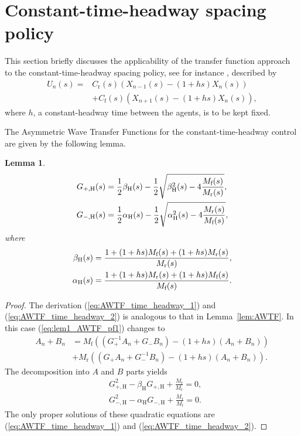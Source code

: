 \documentclass[10pt,twocolumn,twoside]{IEEEtran}
\newtheorem{lemma}{Lemma}
\theoremstyle{definition}
\newcommand{\revB}{Black}
\begin{document}
{\color{\revB}
\section{Constant-time-headway spacing policy}

This section briefly discusses the applicability of the transfer function approach to the constant-time-headway spacing policy, see for instance \cite{Eyre1998a}, described by
\begin{align}
U_n(s) =& C_{\text{r}}(s)(X_{n-1}(s)-(1+hs)X_n(s))\nonumber\\
&+C_{\text{f}}(s)(X_{n+1}(s)-(1+hs)X_n(s)),
\end{align}
where $h$, a constant-headway time between the agents, is to be kept fixed.

The Asymmetric Wave Transfer Functions for the constant-time-headway control are given by the following lemma.
\begin{lemma}
  \begin{align}
  G_{+,\textnormal{H}}(s) &= \frac{1}{2}\beta_{\textnormal{H}}(s) - \frac{1}{2}\sqrt{\beta_{\textnormal{H}}^2(s) - 4\frac{M_{\textnormal{f}}(s)}{M_{\textnormal{r}}(s)}},\label{eq:AWTF_time_headway_1}\\
  G_{-,\textnormal{H}}(s) &= \frac{1}{2}\alpha_{\textnormal{H}}(s) - \frac{1}{2}\sqrt{\alpha_{\textnormal{H}}^2(s) - 4\frac{M_{\textnormal{r}}(s)}{M_{\textnormal{f}}(s)}},\label{eq:AWTF_time_headway_2}
\end{align}
where
\begin{align}
  \beta_{\textnormal{H}}(s) &= \frac{1+(1+hs)M_{\textnormal{f}}(s)+(1+hs)M_{\textnormal{r}}(s)}{M_{\textnormal{r}}(s)},\\
  \alpha_{\textnormal{H}}(s) &= \frac{1+(1+hs)M_{\textnormal{r}}(s)+(1+hs)M_{\textnormal{f}}(s)}{M_{\textnormal{f}}(s)}.
\end{align}
\end{lemma}
\begin{proof}
  The derivation (\ref{eq:AWTF_time_headway_1}) and (\ref{eq:AWTF_time_headway_2}) is analogous to that in Lemma~\ref{lem:AWTF}. In this case (\ref{eq:lem1_AWTF_pf1}) changes to
  \begin{align}
     A_n + B_n &= M_{\text{f}}\left((G_+^{-1}A_{n}+G_-B_{n})-(1+hs)(A_n+B_n)\right)\nonumber\\
  & + M_{\text{r}}\left((G_+A_{n}+G_-^{-1}B_{n})-(1+hs)(A_n+B_n)\right).
  \end{align}
  The decomposition into $A$ and $B$ parts yields
  \begin{align}
  &G_{+,\text{H}}^{2}-\beta_{\text{H}} G_{+,\text{H}} + \frac{M_{\text{f}}}{M_{\text{r}}} = 0,\\
  &G_{-,\text{H}}^{2}-\alpha_{\text{H}} G_{-,\text{H}} + \frac{M_{\text{r}}}{M_{\text{f}}} = 0.
\end{align}
The only proper solutions of these quadratic equations are (\ref{eq:AWTF_time_headway_1}) and (\ref{eq:AWTF_time_headway_2}).
\end{proof}

}
\end{document}
